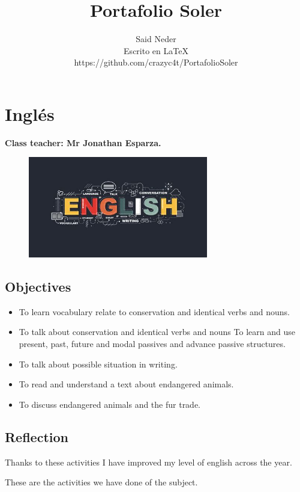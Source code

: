 \documentclass[a4paper, 12pt]{article}
\title{Portafolio Soler}
\author{Said Neder\\Escrito en \LaTeX\\https://github.com/crazyc4t/PortafolioSoler}
\begin{document}
\maketitle
\tableofcontents

\section{Inglés}
\textbf{Class teacher: Mr Jonathan Esparza.}

\begin{figure}[h]
  \includegraphics[width=0.7\textwidth, center]{english.jpeg}
\end{figure}

\subsection{Objectives}

\begin{itemize}
  \item To learn vocabulary relate to conservation and identical verbs and nouns.
  \item To talk about conservation and identical verbs and nouns
    To learn and use present, past, future and modal passives and advance passive structures.
  \item To talk about possible situation in writing.
  \item To read and understand a text about endangered animals.
  \item To discuss endangered animals and the fur trade.
\end{itemize}

\subsection{Reflection}
Thanks to these activities I have improved my level of english across the year.

These are the activities we have done of the subject.
\end{document}
